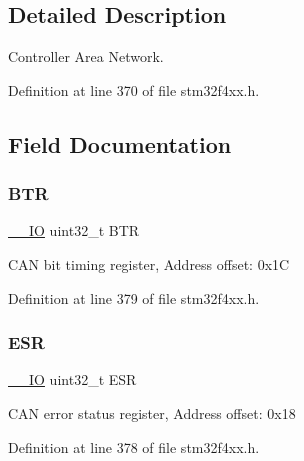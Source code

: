 \subsection{Detailed Description}
Controller Area Network. 

Definition at line 370 of file stm32f4xx.\+h.



\subsection{Field Documentation}
\mbox{\label{struct_c_a_n___type_def_a5c0fcd3e7b4c59ab1dd68f6bd8f74e07}} 
\subsubsection{\texorpdfstring{B\+TR}{BTR}}
{\footnotesize\ttfamily \hyperlink{group___c_m_s_i_s__core__definitions_gaec43007d9998a0a0e01faede4133d6be}{\+\_\+\+\_\+\+IO} uint32\+\_\+t B\+TR}

C\+AN bit timing register, Address offset\+: 0x1C 

Definition at line 379 of file stm32f4xx.\+h.

\mbox{\label{struct_c_a_n___type_def_a2b39f943954e0e7d177b511d9074a0b7}} 
\subsubsection{\texorpdfstring{E\+SR}{ESR}}
{\footnotesize\ttfamily \hyperlink{group___c_m_s_i_s__core__definitions_gaec43007d9998a0a0e01faede4133d6be}{\+\_\+\+\_\+\+IO} uint32\+\_\+t E\+SR}

C\+AN error status register, Address offset\+: 0x18 

Definition at line 378 of file stm32f4xx.\+h.

\mbox{\label{struct_c_a_n___type_def_aaf76271f4ab0b3deb3ceb6e2ac0d62d0}} 
